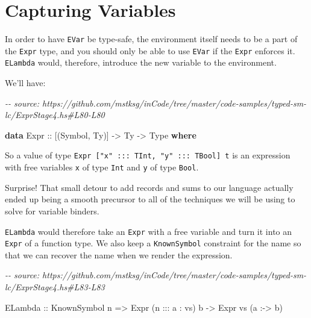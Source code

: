 \documentclass[]{article}
\newenvironment{Shaded}{}{}
\newcommand{\CommentTok}[1]{\textcolor[rgb]{0.38,0.63,0.69}{\textit{#1}}}
\newcommand{\DataTypeTok}[1]{\textcolor[rgb]{0.56,0.13,0.00}{#1}}
\newcommand{\KeywordTok}[1]{\textcolor[rgb]{0.00,0.44,0.13}{\textbf{#1}}}
\newcommand{\NormalTok}[1]{#1}
\newcommand{\OperatorTok}[1]{\textcolor[rgb]{0.40,0.40,0.40}{#1}}
\newcommand{\OtherTok}[1]{\textcolor[rgb]{0.00,0.44,0.13}{#1}}
\begin{document}
\section{Capturing Variables}\label{capturing-variables}

In order to have \texttt{EVar} be type-safe, the environment itself needs to be
a part of the \texttt{Expr} type, and you should only be able to use
\texttt{EVar} if the \texttt{Expr} enforces it. \texttt{ELambda} would,
therefore, introduce the new variable to the environment.

We'll have:

\begin{Shaded}
\begin{Highlighting}[]
\CommentTok{{-}{-} source: https://github.com/mstksg/inCode/tree/master/code{-}samples/typed{-}sm{-}lc/ExprStage4.hs\#L80{-}L80}

\KeywordTok{data} \DataTypeTok{Expr}\OtherTok{ ::}\NormalTok{ [(}\DataTypeTok{Symbol}\NormalTok{, }\DataTypeTok{Ty}\NormalTok{)] }\OtherTok{{-}\textgreater{}} \DataTypeTok{Ty} \OtherTok{{-}\textgreater{}} \DataTypeTok{Type} \KeywordTok{where}
\end{Highlighting}
\end{Shaded}

So a value of type \texttt{Expr\ {[}"x"\ :::\ TInt,\ "y"\ :::\ TBool{]}\ t} is
an expression with free variables \texttt{x} of type \texttt{Int} and \texttt{y}
of type \texttt{Bool}.

Surprise! That small detour to add records and sums to our language actually
ended up being a smooth precursor to all of the techniques we will be using to
solve for variable binders.

\texttt{ELambda} would therefore take an \texttt{Expr} with a free variable and
turn it into an \texttt{Expr} of a function type. We also keep a
\texttt{KnownSymbol} constraint for the name so that we can recover the name
when we render the expression.

\begin{Shaded}
\begin{Highlighting}[]
\CommentTok{{-}{-} source: https://github.com/mstksg/inCode/tree/master/code{-}samples/typed{-}sm{-}lc/ExprStage4.hs\#L83{-}L83}

  \DataTypeTok{ELambda}\OtherTok{ ::} \DataTypeTok{KnownSymbol}\NormalTok{ n }\OtherTok{=\textgreater{}} \DataTypeTok{Expr}\NormalTok{ (n }\OperatorTok{:::}\NormalTok{ a \textquotesingle{}}\OperatorTok{:}\NormalTok{ vs) b }\OtherTok{{-}\textgreater{}} \DataTypeTok{Expr}\NormalTok{ vs (a }\OperatorTok{:{-}\textgreater{}}\NormalTok{ b)}
\end{Highlighting}
\end{Shaded}
\end{document}
